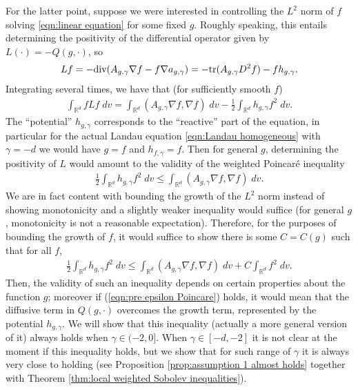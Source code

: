 \documentclass[12pt,american]{amsart}
\numberwithin{equation}{section}
\theoremstyle{plain}
\theoremstyle{definition}                  %
\def\dive{\textnormal{div}}
\begin{document}
{For the latter point, suppose we were interested in controlling the $L^2$ norm of $f$ solving \eqref{eqn:linear equation} for some fixed $g$. Roughly speaking, this entails determining the positivity of the differential operator given by $L(\cdot) = -Q(g,\cdot)$, so
\begin{align*}
  Lf = -\dive(A_{g,\gamma} \nabla f - f \nabla a_{g,\gamma}) = -\textnormal{tr}(A_{g,\gamma}D^2f) - fh_{g,\gamma}.
\end{align*}
Integrating several times, we have that (for sufficiently smooth $f$)
\begin{align*}
  \int_{\mathbb{R}^d} fLf\;dv = \int_{\mathbb{R}^d} (A_{g,\gamma}\nabla f,\nabla f)\;dv-\tfrac{1}{2}\int_{\mathbb{R}^d}h_{g,\gamma} f^2\;dv.
\end{align*}
The ``potential'' $h_{g,\gamma}$ corresponds to the ``reactive'' part of the equation, in particular for the actual Landau equation \eqref{eqn:Landau homogeneous} with $\gamma=-d$ we would  have $g=f$ and $h_{f,\gamma} = f$. Then for general $g$, determining the positivity of $L$ would amount to the validity of the weighted Poincar\'e inequality
\begin{align*}
  \tfrac{1}{2}\int_{\mathbb{R}^d}h_{g,\gamma} f^2\;dv\leq \int_{\mathbb{R}^d} (A_{g,\gamma}\nabla f,\nabla f)\;dv.
\end{align*}
We are in fact content with bounding the growth of the $L^2$ norm instead of showing monotonicity and a slightly weaker inequality would suffice (for general $g$, monotonicity is not a reasonable expectation). Therefore, for the purposes of bounding the growth of $f$, it would suffice to show there is some $C = C(g)$ such that for all $f$,
\begin{align}\label{eqn:pre epsilon Poincare}
  \tfrac{1}{2}\int_{\mathbb{R}^d}h_{g,\gamma} f^2\;dv\leq \int_{\mathbb{R}^d} (A_{g,\gamma}\nabla f,\nabla f)\;dv + C\int_{\mathbb{R}^d}f^2\;dv.
\end{align}
Then, the validity of such an inequality depends on certain properties about the function $g$; moreover if (\ref{eqn:pre epsilon Poincare}) holds, it would mean that the diffusive term in $Q(g,\cdot)$ overcomes the growth term, represented by the potential $h_{g,\gamma}$. We will show that this inequality (actually a more general version of it) always holds when $\gamma \in (-2,0]$. When $\gamma \in [-d,-2]$ it is not clear at the moment  if this inequality holds, but we show that for such range of $\gamma$ it is always very close to holding (see Proposition \ref{prop:assumption 1 almost holds} together with Theorem \ref{thm:local weighted Sobolev inequalities}). }
\end{document}
